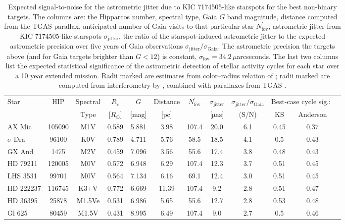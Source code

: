 \begin{table}
\footnotesize
\begin{tabular}{lccccccccccc}
Star & HIP & Spectral & $R_\star$ & $G$ & Distance & $N^\prime_{\mathrm{fov}}$ & $\sigma_{\mathrm{jitter}}$ & $\sigma_{\mathrm{jitter}}/\sigma_{\mathrm{Gaia}}$ & \multicolumn{2}{c}{Best-case cycle sig.:} \\ 
 &  & Type & [$R_\odot$] & [mag] & [$\mathrm{pc}$] & & [$\mathrm{\mu as}$] & (S/N) & KS & Anderson\\ \hline\hline
AX Mic & 105090 & M1V & 0.589\tablenotemark{a} & 5.881 & 3.98 & 107.4 & 20.0 & 6.1 & 0.45 & 0.37 \\
$\sigma$ Dra & 96100 & K0V & 0.789\tablenotemark{a} & 4.711 & 5.76 & 58.5 & 18.5 & 4.1 & 0.5 & 0.43 \\
GX And & 1475 & M2V & 0.459\tablenotemark{b} & 7.096 & 3.56 & 55.6 & 17.4 & 3.8 & 0.48 & 0.43 \\
HD 79211 & 120005 & M0V & 0.572\tablenotemark{b} & 6.948 & 6.29 & 107.4 & 12.3 & 3.7 & 0.51 & 0.45 \\
LHS 3531 & 99701 & M0V & 0.564\tablenotemark{a} & 7.134 & 6.16 & 69.1 & 12.4 & 3.0 & 0.51 & 0.45 \\
HD 222237 & 116745 & K3+V & 0.772\tablenotemark{a} & 6.669 & 11.39 & 107.4 & 9.2 & 2.8 & 0.51 & 0.47 \\
HD 36395 & 25878 & M1.5Ve & 0.531\tablenotemark{b} & 6.986 & 5.65 & 55.6 & 12.7 & 2.8 & 0.53 & 0.48 \\
Gl 625 & 80459 & M1.5V & 0.431\tablenotemark{a} & 8.995 & 6.49 & 107.4 & 9.0 & 2.7 & 0.5 & 0.46 \\
\end{tabular}
\caption{Expected signal-to-noise for the astrometric jitter due to KIC 7174505-like starspots for the best non-binary targets. The columns are: the Hipparcos number, spectral type, Gaia $G$ band magnitude, distance computed from the TGAS parallax, anticipated number of Gaia visits to that particular star $N^\prime_{\mathrm{fov}}$, astrometric jitter from KIC 7174505-like starspots $\sigma_{\mathrm{jitter}}$,  the ratio of the starspot-induced astrometric jitter to the expected astrometric precision over five years of Gaia observations $\sigma_{\mathrm{jitter}}/\sigma_{\mathrm{Gaia}}$. The astrometric precision the targets above (and for Gaia targets brighter than $G < 12$) is constant, $\sigma_{\mathrm{fov}} = 34.2 \,\mu$arcseconds. The last two columns list the expected statistical significance of the astrometric detection of stellar activity cycles for each star over a 10 year extended mission. Radii marked  are estimates from color--radius relation of \citet{boyajian2012}; radii marked  are computed from interferometry by \citet{boyajian2012}, combined with parallaxes from TGAS \citep{Michalik2015}.
\label{tab:stars}}
\end{table}


